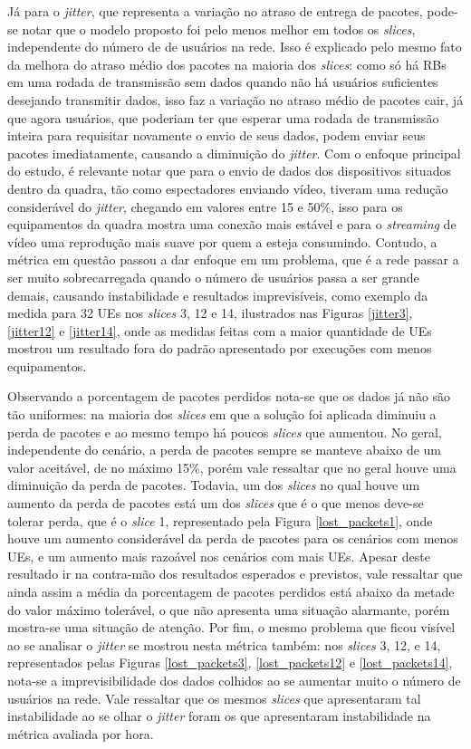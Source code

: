 \documentclass[12pt, a4paper]{article}
\begin{document}
Já para o \textit{jitter}, que representa a variação no atraso de entrega de pacotes, pode-se notar que o modelo proposto foi pelo menos melhor em todos os \textit{slices}, independente do número de de usuários na rede. Isso é explicado pelo mesmo fato da melhora do atraso médio dos pacotes na maioria dos \textit{slices}: como só há RBs em uma rodada de transmissão sem dados quando não há usuários suficientes desejando transmitir dados, isso faz a variação no atraso médio de pacotes cair, já que agora usuários, que poderiam ter que esperar uma rodada de transmissão inteira para requisitar novamente o envio de seus dados, podem enviar seus pacotes imediatamente, causando a diminuição do \textit{jitter}. Com o enfoque principal do estudo, é relevante notar que para o envio de dados dos dispositivos situados dentro da quadra, tão como espectadores enviando vídeo, tiveram uma redução considerável do \textit{jitter}, chegando em valores entre 15 e 50\%, isso para os equipamentos da quadra mostra uma conexão mais estável e para o \textit{streaming} de vídeo uma reprodução mais suave por quem a esteja consumindo. Contudo, a métrica em questão passou a dar enfoque em um problema, que é a rede passar a ser muito sobrecarregada quando o número de usuários passa a ser grande demais, causando instabilidade e resultados imprevisíveis, como exemplo da medida para 32 UEs nos  \textit{slices} 3, 12 e 14, ilustrados nas Figuras \ref{jitter3}, \ref{jitter12} e \ref{jitter14}, onde as medidas feitas com a maior quantidade de UEs mostrou um resultado fora do padrão apresentado por execuções com menos equipamentos.

Observando a porcentagem de pacotes perdidos nota-se que os dados já não são tão uniformes: na maioria dos \textit{slices} em que a solução foi aplicada diminuiu a perda de pacotes e ao mesmo tempo há poucos \textit{slices} que aumentou. No geral, independente do cenário, a perda de pacotes sempre se manteve abaixo de um valor aceitável, de no máximo 15\%, porém vale ressaltar que no geral houve uma diminuição da perda de pacotes. Todavia, um dos \textit{slices} no qual houve um aumento da perda de pacotes está um dos \textit{slices} que é o que menos deve-se tolerar perda, que é o \textit{slice} 1, representado pela Figura \ref{lost_packets1}, onde houve um aumento considerável da perda de pacotes para os cenários com menos UEs, e um aumento mais razoável nos cenários com mais UEs. Apesar deste resultado ir na contra-mão dos resultados esperados e previstos, vale ressaltar que ainda assim a média da porcentagem de pacotes perdidos está abaixo da metade do valor máximo tolerável, o que não apresenta uma situação alarmante, porém mostra-se uma situação de atenção. Por fim, o mesmo problema que ficou visível ao se analisar o  \textit{jitter} se mostrou nesta métrica também: nos \textit{slices} 3, 12, e 14, representados pelas Figuras \ref{lost_packets3}, \ref{lost_packets12} e \ref{lost_packets14}, nota-se a imprevisibilidade dos dados colhidos ao se aumentar muito o número de usuários na rede. Vale ressaltar que os mesmos \textit{slices} que apresentaram tal instabilidade ao se olhar o \textit{jitter} foram os que apresentaram instabilidade na métrica avaliada por hora.
\end{document}
